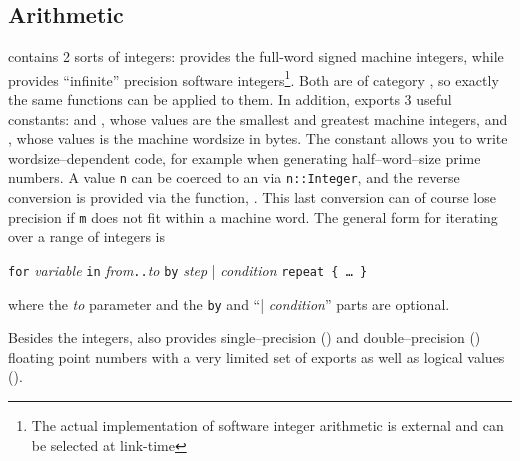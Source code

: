 \subsection{Arithmetic}
\salli contains 2 sorts of integers:  provides
the full-word signed machine integers, while  provides
``infinite'' precision software integers\footnote{The actual implementation
of software integer arithmetic is external and can be selected at link-time}.
Both are of category , so exactly the same functions
can be applied to them. In addition,  exports 3 useful
constants: 
and , whose values are the smallest and
greatest machine integers,
and , whose values is the
machine wordsize in bytes.
The  constant allows you to write
wordsize--dependent code, for example when generating half--word--size prime
numbers. A  value {\tt n}
can be coerced to an 
via {\tt n::Integer}, and the reverse conversion is provided via the
 function,
. This last conversion can
of course lose precision if {\tt m} does not fit within a machine word.
The general form for iterating over a range of integers is\\
\centerline{ {\tt for} {\em variable} {\tt in} {\em from}{\tt..}{\em to}
{\tt by} {\em step} | {\em condition} {\tt repeat \{ \dots~\}} }
where the {\em to} parameter and the {\tt by} and ``| {\em condition}''
parts are optional.

Besides the integers, \salli also provides single--precision
() and double--precision ()
floating point numbers with a very limited set of exports as well
as logical values ().

